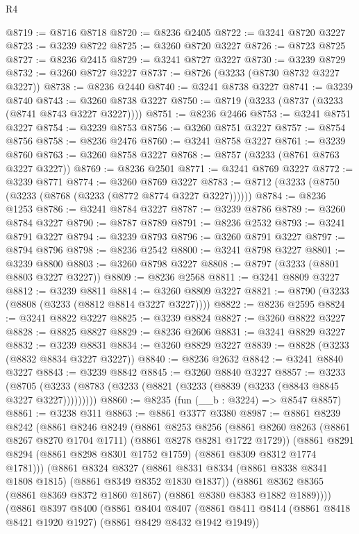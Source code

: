 \begin{lexlean}{R4}
\begin{coremodule}
@8719 := @8716 @8718
@8720 := @8236 @2405
@8722 := @3241 @8720 @3227
@8723 := @3239 @8722
@8725 := @3260 @8720 @3227
@8726 := @8723 @8725
@8727 := @8236 @2415
@8729 := @3241 @8727 @3227
@8730 := @3239 @8729
@8732 := @3260 @8727 @3227
@8737 := @8726 (@3233 (@8730 @8732 @3227 @3227))
@8738 := @8236 @2440
@8740 := @3241 @8738 @3227
@8741 := @3239 @8740
@8743 := @3260 @8738 @3227
@8750 := @8719 (@3233 (@8737 (@3233 (@8741 @8743 @3227 @3227))))
@8751 := @8236 @2466
@8753 := @3241 @8751 @3227
@8754 := @3239 @8753
@8756 := @3260 @8751 @3227
@8757 := @8754 @8756
@8758 := @8236 @2476
@8760 := @3241 @8758 @3227
@8761 := @3239 @8760
@8763 := @3260 @8758 @3227
@8768 := @8757 (@3233 (@8761 @8763 @3227 @3227))
@8769 := @8236 @2501
@8771 := @3241 @8769 @3227
@8772 := @3239 @8771
@8774 := @3260 @8769 @3227
@8783 := @8712 (@3233 (@8750 (@3233 (@8768 (@3233 (@8772 @8774 @3227 @3227))))))
@8784 := @8236 @1253
@8786 := @3241 @8784 @3227
@8787 := @3239 @8786
@8789 := @3260 @8784 @3227
@8790 := @8787 @8789
@8791 := @8236 @2532
@8793 := @3241 @8791 @3227
@8794 := @3239 @8793
@8796 := @3260 @8791 @3227
@8797 := @8794 @8796
@8798 := @8236 @2542
@8800 := @3241 @8798 @3227
@8801 := @3239 @8800
@8803 := @3260 @8798 @3227
@8808 := @8797 (@3233 (@8801 @8803 @3227 @3227))
@8809 := @8236 @2568
@8811 := @3241 @8809 @3227
@8812 := @3239 @8811
@8814 := @3260 @8809 @3227
@8821 := @8790 (@3233 (@8808 (@3233 (@8812 @8814 @3227 @3227))))
@8822 := @8236 @2595
@8824 := @3241 @8822 @3227
@8825 := @3239 @8824
@8827 := @3260 @8822 @3227
@8828 := @8825 @8827
@8829 := @8236 @2606
@8831 := @3241 @8829 @3227
@8832 := @3239 @8831
@8834 := @3260 @8829 @3227
@8839 := @8828 (@3233 (@8832 @8834 @3227 @3227))
@8840 := @8236 @2632
@8842 := @3241 @8840 @3227
@8843 := @3239 @8842
@8845 := @3260 @8840 @3227
@8857 := @3233
    (@8705 (@3233 (@8783 (@3233 (@8821 (@3233 (@8839 (@3233 (@8843 @8845 @3227 @3227)))))))))
@8860 := @8235 (fun (__b : @3224) => @8547 @8857)
@8861 := @3238 @311
@8863 := @8861 @3377 @3380
@8987 := @8861
    @8239
    @8242
    (@8861
      @8246
      @8249
      (@8861
        @8253
        @8256
        (@8861 @8260 @8263 (@8861 @8267 @8270 @1704 @1711) (@8861 @8278 @8281 @1722 @1729))
        (@8861 @8291 @8294 (@8861 @8298 @8301 @1752 @1759) (@8861 @8309 @8312 @1774 @1781)))
      (@8861
        @8324
        @8327
        (@8861 @8331 @8334 (@8861 @8338 @8341 @1808 @1815) (@8861 @8349 @8352 @1830 @1837))
        (@8861 @8362 @8365 (@8861 @8369 @8372 @1860 @1867) (@8861 @8380 @8383 @1882 @1889))))
    (@8861
      @8397
      @8400
      (@8861
        @8404
        @8407
        (@8861 @8411 @8414 (@8861 @8418 @8421 @1920 @1927) (@8861 @8429 @8432 @1942 @1949))

\end{coremodule}
\end{lexlean}
